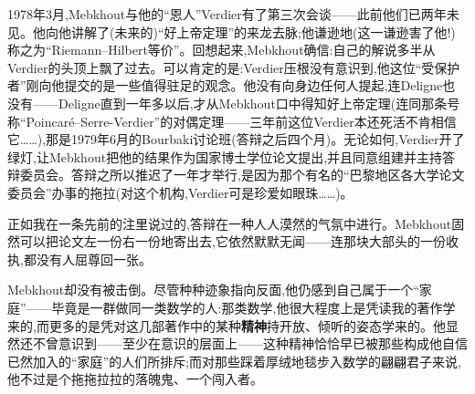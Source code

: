 \asterisms

\dmark{}1978年3月,Mebkhout与他的“恩人”Verdier有了第三次会谈——此前他们已两年未见。他向他讲解了(未来的)“好上帝定理”的来龙去脉;他谦逊地(这一谦逊害了他!)称之为“Riemann--Hilbert等价”。回想起来,Mebkhout确信:自己的解说多半从Verdier的头顶上飘了过去。可以肯定的是:Verdier压根没有意识到,他这位“受保护者”刚向他提交的是一些值得驻足的观念。他没有向身边任何人提起,连Deligne也没有——Deligne直到一年多以后,才从Mebkhout口中得知好上帝定理(连同那条号称“Poincaré--Serre-Verdier”的对偶定理——三年前这位Verdier本还死活不肯相信它……),那是1979年6月的Bourbaki讨论班(答辩之后四个月)。无论如何,Verdier开了绿灯,让Mebkhout把他的结果作为国家博士学位论文提出,并且同意组建并主持答辩委员会。答辩之所以推迟了一年才举行,是因为那个有名的“巴黎地区各大学论文委员会”办事的拖拉(对这个机构,Verdier可是珍爱如眼珠……)。

\noindent 正如我在一条先前的注里说过的,答辩在一种人人漠然的气氛中进行。Mebkhout固然可以把论文左一份右一份地寄出去,它依然默默无闻——连那块大部头的一份收执,都没有人屈尊回一张。

\noindent Mebkhout却没有被击倒。尽管种种迹象指向反面,他仍感到自己属于一个“家庭”——毕竟是一群做同一类数学的人:那类数学,他很大程度上是凭读我的著作学来的,而更多的是凭对这几部著作中的某种\textbf{精神}持开放、\dmark{}倾听的姿态学来的。他显然还不曾意识到——至少在意识的层面上——这种精神恰恰早已被那些构成他自信已然加入的“家庭”的人们所排斥;而对那些踩着厚绒地毯步入数学的翩翩君子来说,他不过是个拖拖拉拉的落魄鬼、一个闯入者。

